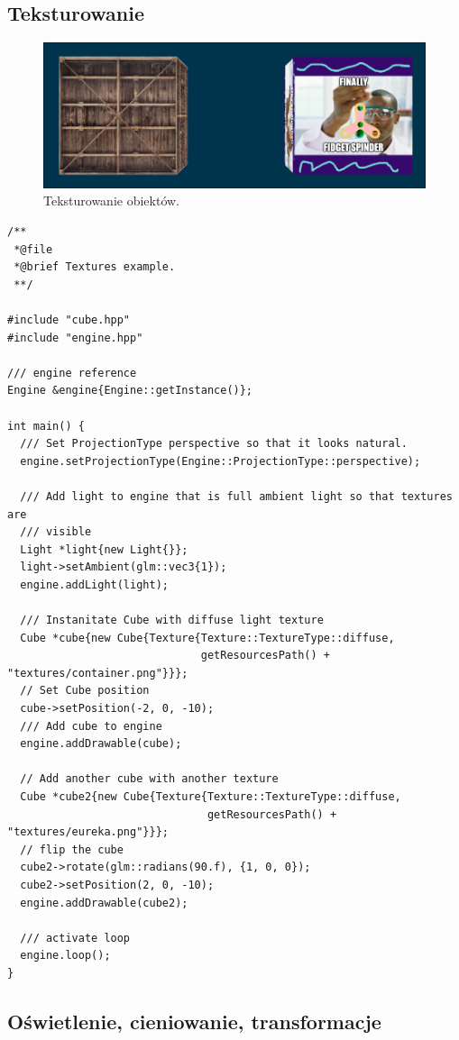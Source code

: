 \documentclass[11pt]{article}
\begin{document}
\subsection{Teksturowanie}
\label{sec:orgf95d41a}

\begin{figure}[htbp]
\centering
\includegraphics[width=.9\linewidth]{img/test15.png}
\caption{Teksturowanie obiektów.}
\end{figure}

\begin{verbatim}
/**
 *@file
 *@brief Textures example.
 **/

#include "cube.hpp"
#include "engine.hpp"

/// engine reference
Engine &engine{Engine::getInstance()};

int main() {
  /// Set ProjectionType perspective so that it looks natural.
  engine.setProjectionType(Engine::ProjectionType::perspective);

  /// Add light to engine that is full ambient light so that textures are
  /// visible
  Light *light{new Light{}};
  light->setAmbient(glm::vec3{1});
  engine.addLight(light);

  /// Instanitate Cube with diffuse light texture
  Cube *cube{new Cube{Texture{Texture::TextureType::diffuse,
                              getResourcesPath() + "textures/container.png"}}};
  // Set Cube position
  cube->setPosition(-2, 0, -10);
  /// Add cube to engine
  engine.addDrawable(cube);

  // Add another cube with another texture
  Cube *cube2{new Cube{Texture{Texture::TextureType::diffuse,
                               getResourcesPath() + "textures/eureka.png"}}};
  // flip the cube
  cube2->rotate(glm::radians(90.f), {1, 0, 0});
  cube2->setPosition(2, 0, -10);
  engine.addDrawable(cube2);

  /// activate loop
  engine.loop();
}
\end{verbatim}
\subsection{Oświetlenie, cieniowanie, transformacje}
\label{sec:org5d4a179}
\end{document}
